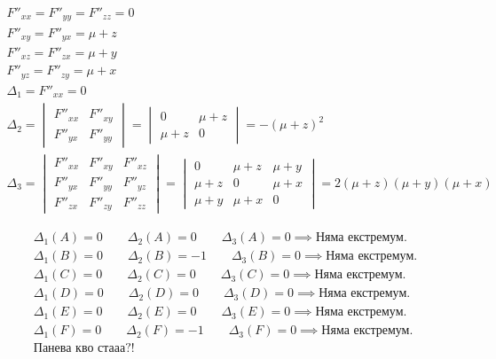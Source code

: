 \documentclass[a4paper,fleqn,12pt]{article}
\theoremstyle{definition}
\begin{document}
\begin{itemize}
\begin{gather*}
F''_{xx} = F''_{yy} =  F''_{zz} = 0 \\
F''_{xy} = F''_{yx} = \mu + z \\
F''_{xz} = F''_{zx} = \mu + y \\
F''_{yz} = F''_{zy} = \mu + x \\ 
\Delta_1 = F''_{xx} =  0 \\
\Delta_2 = \begin{vmatrix} F''_{xx} & F''_{xy} \\ F''_{yx} & F''_{yy} \end{vmatrix} = \begin{vmatrix} 0 & \mu + z  \\   \mu + z  & 0 \end{vmatrix} = -(\mu + z)^2 \\
\Delta_3 = \begin{vmatrix} F''_{xx} & F''_{xy} & F''_{xz}\\ F''_{yx} & F''_{yy} & F''_{yz} \\ F''_{zx} & F''_{zy} & F''_{zz}\end{vmatrix} = \begin{vmatrix} 0 &  \mu + z  &  \mu + y  \\ \mu + z  &  0  &  \mu + x  \\  \mu + y  &  \mu + x  & 0 \end{vmatrix} = 2( \mu + z)( \mu + y )( \mu + x )
\end{gather*}

\begin{gather*}
\Delta_1(A) = 0 \qquad \Delta_2(A) = 0 \qquad \Delta_3(A) = 0 \implies \text{Няма екстремум.}\\
\Delta_1(B) = 0 \qquad \Delta_2(B) = -1 \qquad \Delta_3(B) = 0 \implies \text{Няма екстремум.}\\
\Delta_1(C) = 0 \qquad \Delta_2(C) = 0 \qquad \Delta_3(C) = 0 \implies \text{Няма екстремум.}\\
\Delta_1(D) = 0 \qquad \Delta_2(D) = 0 \qquad \Delta_3(D) = 0 \implies \text{Няма екстремум.}\\
\Delta_1(E) = 0 \qquad \Delta_2(E) = 0 \qquad \Delta_3(E) = 0 \implies \text{Няма екстремум.}\\
\Delta_1(F) = 0 \qquad \Delta_2(F) = -1 \qquad \Delta_3(F) = 0 \implies \text{Няма екстремум.}\\
\text{Панева кво стааа?!}
\end{gather*}

\end{itemize}
\end{document}

